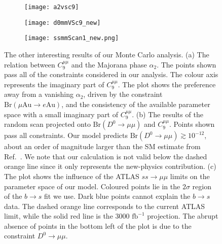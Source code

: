 \begin{figure}[b!]
  \centering
  \begin{subfigure}{0.495\linewidth}
    \centering
    \texttt{[image: a2vsc9]}
    \caption{}
    \label{fig:ch4-subfig1}
  \end{subfigure}
  \begin{subfigure}{0.495\linewidth}
    \centering
    \texttt{[image: d0mmVSc9\_new]}
    \caption{}
    \label{fig:ch4-subfig2}
  \end{subfigure}
  \begin{subfigure}{0.497\linewidth}
    \centering
    \texttt{[image: ssmmScan1\_new.png]}
    \caption{}
    \label{fig:ch4-subfig3}
  \end{subfigure}
  \caption[The other interesting results of our Monte Carlo analysis. (a) The
  relation between $C_{9}^{\mu\mu}$ and the Majorana phase $\alpha_{2}$. (b) The
  results of the random scan projected onto $\text{Br}(D^{0} \to \mu \mu)$ and
  $C_{9}^{\mu\mu}$.]{The other interesting results of our Monte Carlo analysis.
    (a) The relation between $C_{9}^{\mu\mu}$ and the Majorana phase
    $\alpha_{2}$. The points shown pass all of the constraints considered in our
    analysis. The colour axis represents the imaginary part of $C_{9}^{\mu\mu}$.
    The plot shows the preference away from a vanishing $\alpha_{2}$, driven by
    the constraint $\text{Br}(\mu \text{Au} \to e \text{Au})$, and the
    consistency of the available parameter space with a small imaginary part of
    $C_{9}^{\mu\mu}$. (b) The results of the random scan projected onto
    $\text{Br}(D^{0} \to \mu \mu)$ and $C_{9}^{\mu\mu}$. Points shown pass all
    constraints. Our model predicts
    $\text{Br}(D^{0} \to \mu \mu) \gtrsim 10^{-12}$, about an order of magnitude
    larger than the SM estimate from Ref.~\cite{Burdman:2001tf}. We note that
    our calculation is not valid below the dashed orange line since it only
    represents the new-physics contribution. (c) The plot shows the influence of
    the ATLAS $ss \to \mu\mu$ limits on the parameter space of our model.
    Coloured points lie in the $2\sigma$ region of the $b \to s$ fit we use.
    Dark blue points cannot explain the $b \to s$ data. The dashed orange line
    corresponds to the current ATLAS limit, while the solid red line is the
    $3000 \text{ fb}^{-1}$ projection. The abrupt absence of points in the
    bottom left of the plot is due to the constraint $D^{0} \to \mu \mu$.}
  \label{fig:ch4-otherscan1results}
\end{figure}

